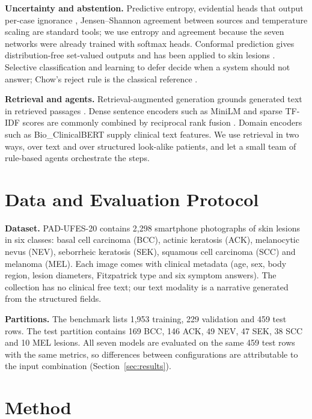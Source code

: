\documentclass[conference]{IEEEtran}
\begin{document}
\textbf{Uncertainty and abstention.} Predictive entropy, evidential heads that output per-case ignorance \cite{sensoy2018}, Jensen--Shannon agreement between sources \cite{lin1991} and temperature scaling \cite{guo2017} are standard tools; we use entropy and agreement because the seven networks were already trained with softmax heads. Conformal prediction gives distribution-free set-valued outputs \cite{vovk2005,angelopoulos2021} and has been applied to skin lesions \cite{fayyad2024}. Selective classification \cite{geifman2017} and learning to defer \cite{mozannar2020} decide when a system should not answer; Chow's reject rule is the classical reference \cite{chow1970}.

\textbf{Retrieval and agents.} Retrieval-augmented generation grounds generated text in retrieved passages \cite{lewis2020}. Dense sentence encoders such as MiniLM \cite{wang2020} and sparse TF-IDF scores are commonly combined by reciprocal rank fusion \cite{cormack2009}. Domain encoders such as Bio\_ClinicalBERT \cite{alsentzer2019} supply clinical text features. We use retrieval in two ways, over text and over structured look-alike patients, and let a small team of rule-based agents orchestrate the steps.

\section{Data and Evaluation Protocol}
\textbf{Dataset.} PAD-UFES-20 \cite{pacheco2020} contains 2,298 smartphone photographs of skin lesions in six classes: basal cell carcinoma (BCC), actinic keratosis (ACK), melanocytic nevus (NEV), seborrheic keratosis (SEK), squamous cell carcinoma (SCC) and melanoma (MEL). Each image comes with clinical metadata (age, sex, body region, lesion diameters, Fitzpatrick type and six symptom answers). The collection has no clinical free text; our text modality is a narrative generated from the structured fields.

\textbf{Partitions.} The benchmark lists 1,953 training, 229 validation and 459 test rows. The test partition contains 169 BCC, 146 ACK, 49 NEV, 47 SEK, 38 SCC and 10 MEL lesions. All seven models are evaluated on the same 459 test rows with the same metrics, so differences between configurations are attributable to the input combination (Section~\ref{sec:results}).

\section{Method}
\end{document}
